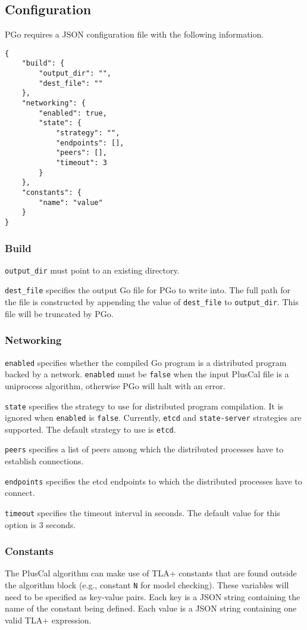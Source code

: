 \subsection{Configuration}
PGo requires a JSON configuration file with the following information.

\begin{lstlisting}
{
	"build": {
		"output_dir": "",
		"dest_file": ""
	},
	"networking": {
		"enabled": true,
		"state": {
			"strategy": "",
			"endpoints": [],
			"peers": [],
			"timeout": 3
		}
	},
	"constants": {
		"name": "value"
	}
}
\end{lstlisting}

\subsubsection{Build}
\noindent\lstinline|output_dir| must point to an existing directory.

\noindent\lstinline|dest_file| specifies the output Go file for PGo to write into. The full path for the file is constructed by appending the value of \lstinline|dest_file| to \lstinline|output_dir|. This file will be truncated by PGo.
\subsubsection{Networking}
\noindent\lstinline|enabled| specifies whether the compiled Go program is a distributed program backed by a network. \lstinline|enabled| must be \lstinline|false| when the input PlusCal file is a uniprocess algorithm, otherwise PGo will halt with an error.

\noindent\lstinline|state| specifies the strategy to use for distributed program compilation. It is ignored when \lstinline|enabled| is \lstinline|false|. Currently, \lstinline|etcd| and \lstinline|state-server| strategies are supported. The default strategy to use is \lstinline|etcd|.

\noindent\lstinline|peers| specifies a list of peers among which the distributed processes have to establish connections.

\noindent\lstinline|endpoints| specifies the etcd endpoints to which the distributed processes have to connect.

\noindent\lstinline|timeout| specifies the timeout interval in seconds. The default value for this option is 3 seconds.
\subsubsection{Constants}
The PlusCal algorithm can make use of TLA+ constants that are found outside the algorithm block (e.g., constant \texttt{N} for model checking). These variables will need to be specified as key-value pairs. Each key is a JSON string containing the name of the constant being defined. Each value is a JSON string containing one valid TLA+ expression.

